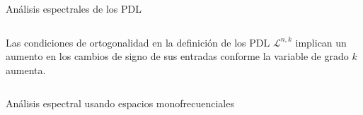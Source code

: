 \documentclass[final,hyperref={pdfpagelabels=false}]{beamer}
\newcommand{\IR}{\mathbb{R}}
\newcommand{\cali}[1]{\mathcal{#1}} %
\begin{document}
\begin{frame}
\begin{columns}
\begin{column}{.49\textwidth}
\begin{block}{An\'alisis espectrales de los PDL}
\begin{columns}
\begin{column}{.59\textwidth}
              	Las condiciones de ortogonalidad en la definici\'on de los
              	PDL $\cali{L}^{n,k}$ 
              	implican un aumento en los cambios de signo de sus entradas
              	conforme la variable de grado $k$ aumenta.
                \end{column}
              \end{columns}
            \end{block}
            \vfill
            \vspace{1cm}
            
            
            \begin{block}{An\'alisis espectral usando espacios monofrecuenciales}
              \begin{columns}
\end{columns}
\end{block}
\end{column}
\end{columns}
\end{frame}
\end{document}
